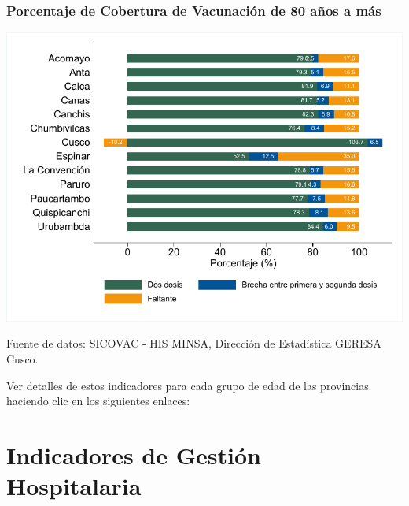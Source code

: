 \documentclass[xcolor=table]{beamer}
\begin{document}
\begin{frame}[label=cobertura_vacuna_provincias]
	\frametitle{Porcentaje de Cobertura de Vacunación de 80 años a más}
	\vspace{-.5cm}
	\begin{center}
		\includegraphics[width=0.8\linewidth, trim={.2cm .5cm .2cm .2cm},clip]{../figuras/vacunacion_provincial_edad_9.pdf}
	\end{center}
	{\tiny Fuente de datos: SICOVAC - HIS MINSA, Dirección de Estadística GERESA Cusco.} \hyperlink{indice}{}
	
	Ver detalles de estos indicadores para cada grupo de edad de las provincias haciendo clic en los siguientes enlaces:
	\hyperlink{vacunas_70}{}
	\hyperlink{vacunas_60}{} \hyperlink{vacunas_50}{} \hyperlink{vacunas_40}{} \hyperlink{vacunas_30}{}
	\hyperlink{vacunas_20}{} \hyperlink{vacunas_10}{}
	
\end{frame}



	\section{Indicadores de Gestión Hospitalaria}
	
\end{document}
